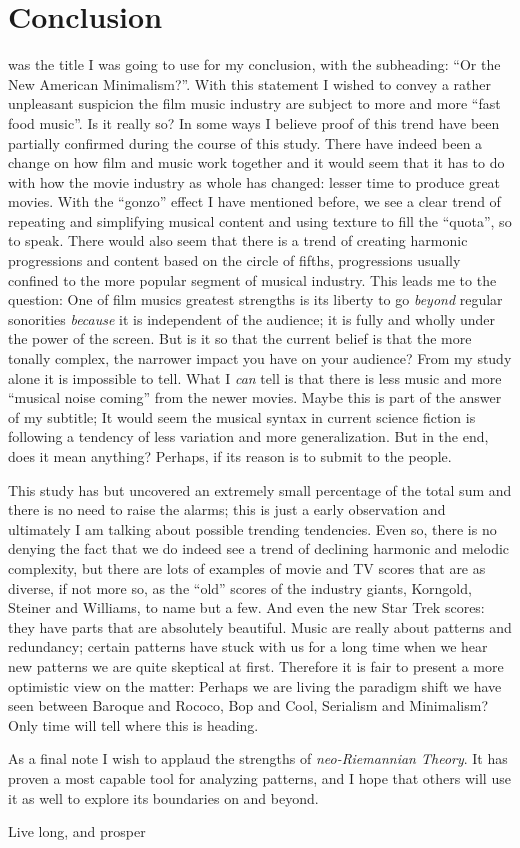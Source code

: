 
\chapter{Conclusion}\label{ch:conclusion}

 was the title I was going to use for my conclusion, with the subheading: ``Or the New American Minimalism?''. With this statement I wished to convey a rather unpleasant suspicion the film music industry are subject to more and more ``fast food music''. Is it really so? In some ways I believe proof of this trend have been partially confirmed during the course of this study. There have indeed been a change on how film and music work together and it would seem that it has to do with how the movie industry as whole has changed: lesser time to produce great movies. With the ``gonzo'' effect I have mentioned before, we see a clear trend of repeating and simplifying musical content and using texture to fill the ``quota'', so to speak. There would also seem that there is a trend of creating harmonic progressions and content based on the circle of fifths, progressions usually confined to the more popular segment of musical industry. This leads me to the question: One of film musics greatest strengths is its liberty to go \textit{beyond} regular sonorities \textit{because} it is independent of the audience; it is fully and wholly under the power of the screen. But is it so that the current belief is that the more tonally complex, the narrower impact you have on your audience? From my study alone it is impossible to tell. What I \textit{can} tell is that there is less music and more ``musical noise coming'' from the newer movies. Maybe this is part of the answer of my subtitle; It would seem the musical syntax in current science fiction is following a tendency of less variation and more generalization. But in the end, does it mean anything? Perhaps, if its reason is to submit to the people.

This study has but uncovered an extremely small percentage of the total sum and there is no need to raise the alarms; this is just a early observation and ultimately I am talking about possible trending tendencies. Even so, there is no denying the fact that we do indeed see a trend of declining harmonic and melodic complexity, but there are lots of examples of movie and TV scores that are as diverse, if not more so, as the ``old'' scores of the industry giants, Korngold, Steiner and Williams, to name but a few. And even the new Star Trek scores: they have parts that are absolutely beautiful. Music are really about patterns and redundancy; certain patterns have stuck with us for a long time when we hear new patterns we are quite skeptical at first. Therefore it is fair to present a more optimistic view on the matter: Perhaps we are living the paradigm shift we have seen between Baroque and Rococo, Bop and Cool, Serialism and Minimalism? Only time will tell where this is heading.

As a final note I wish to applaud the strengths of \textit{neo-Riemannian Theory}. It has proven a most capable tool for analyzing patterns, and I hope that others will use it as well to explore its boundaries on and beyond. 

\vspace{5cm}
\center
Live long, and prosper

